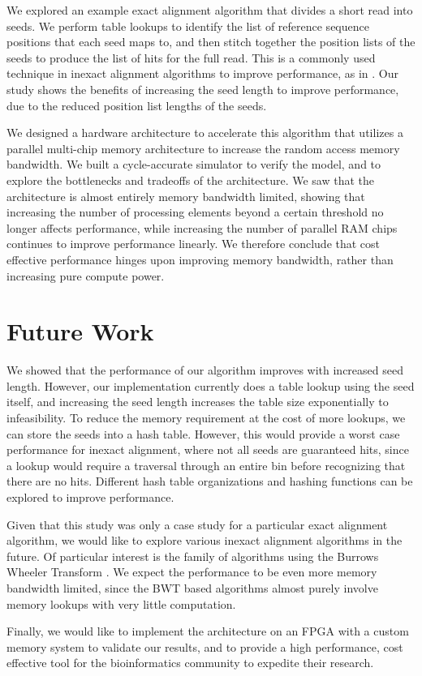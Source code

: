 \documentclass[11pt]{article}
\begin{document}
	We explored an example exact alignment algorithm that divides a short read into seeds. We perform table lookups to identify the list of reference sequence positions that each seed maps to, and then stitch together the position lists of the seeds to produce the list of hits for the full read.  This is a commonly used technique in inexact alignment algorithms to improve performance, as in \cite{ning2001ssaha, toh2009basic, zaharia2011faster}.  Our study shows the benefits of increasing the seed length to improve performance, due to the reduced position list lengths of the seeds.


We designed a hardware architecture to accelerate this algorithm that utilizes a parallel multi-chip memory architecture to increase the random access memory bandwidth.  We built a cycle-accurate simulator to verify the model, and to explore the bottlenecks and tradeoffs of the architecture.  We saw that the architecture is almost entirely memory bandwidth limited, showing that increasing the number of processing elements beyond a certain threshold no longer affects performance, while increasing the number of parallel RAM chips continues to improve performance linearly.  We therefore conclude that cost effective performance hinges upon improving memory bandwidth, rather than increasing pure compute power.

\section{Future Work}

We showed that the performance of our algorithm improves with increased seed length.  However, our implementation currently does a table lookup using the seed itself, and increasing the seed length increases the table size exponentially to infeasibility.  To reduce the memory requirement at the cost of more lookups, we can store the seeds into a hash table.  However, this would provide a worst case performance for inexact alignment, where not all seeds are guaranteed hits, since a lookup would require a traversal through an entire bin before recognizing that there are no hits.  Different hash table organizations and hashing functions can be explored to improve performance.


Given that this study was only a case study for a particular exact alignment algorithm, we would like to explore various inexact alignment algorithms in the future.  Of particular interest is the family of algorithms using the Burrows Wheeler Transform \cite{li2009fast}.  We expect the performance to be even more memory bandwidth limited, since the BWT based algorithms almost purely involve memory lookups with very little computation.


Finally, we would like to implement the architecture on an FPGA with a custom memory system to validate our results, and to provide a high performance, cost effective tool for the bioinformatics community to expedite their research.





{
  
}
\end{document}
